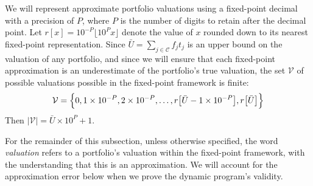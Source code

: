 \documentclass[11pt]{article} %
\theoremstyle{definition}
\theoremstyle{definition}
\begin{document}
We will represent approximate portfolio valuations using a fixed-point decimal with a precision of $P$, where $P$ is the number of digits to retain after the decimal point. Let $r[x] =  10^{-P}\lfloor 10^P x \rfloor$ denote the value of $x$ rounded down to its nearest fixed-point representation. Since $\bar U = \sum_{j\in \mathcal{C}} f_j t_j$ is an upper bound on the valuation of any portfolio, and since we will ensure that each fixed-point approximation is an underestimate of the portfolio's true valuation, the set $\mathcal{V}$ of possible valuations possible in the fixed-point framework is finite:
\begin{equation}
\mathcal{V} = \Bigl\{0, 1\times 10^{-P}, 2\times 10^{-P}, \dots, r\bigl[\bar U- 1\times 10^{-P}\bigr], r\bigl[\bar U\bigr]\Bigr\}
\end{equation}
Then $|\mathcal{V} | = \bar U \times 10^P + 1$.

For the remainder of this subsection, unless otherwise specified, the word \emph{valuation} refers to a portfolio’s valuation within the fixed-point framework, with the understanding that this is an approximation. We will account for the approximation error below when we prove the dynamic program’s validity. 
\end{document}
